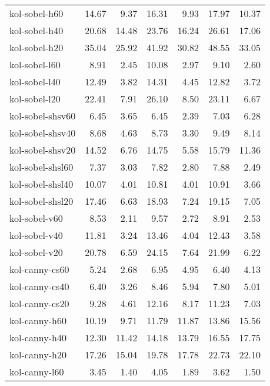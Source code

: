 \begin{tabular}{lrrrrrr}
kol-sobel-h60       &   14.67 &    9.37 &   16.31 &    9.93 &   17.97 &   10.37 \\
kol-sobel-h40       &   20.68 &   14.48 &   23.76 &   16.24 &   26.61 &   17.06 \\
kol-sobel-h20       &   35.04 &   25.92 &   41.92 &   30.82 &   48.55 &   33.05 \\
kol-sobel-l60       &    8.91 &    2.45 &   10.08 &    2.97 &    9.10 &    2.60 \\
kol-sobel-l40       &   12.49 &    3.82 &   14.31 &    4.45 &   12.82 &    3.72 \\
kol-sobel-l20       &   22.41 &    7.91 &   26.10 &    8.50 &   23.11 &    6.67 \\
kol-sobel-shsv60    &    6.45 &    3.65 &    6.45 &    2.39 &    7.03 &    6.28 \\
kol-sobel-shsv40    &    8.68 &    4.63 &    8.73 &    3.30 &    9.49 &    8.14 \\
kol-sobel-shsv20    &   14.52 &    6.76 &   14.75 &    5.58 &   15.79 &   11.36 \\
kol-sobel-shsl60    &    7.37 &    3.03 &    7.82 &    2.80 &    7.88 &    2.49 \\
kol-sobel-shsl40    &   10.07 &    4.01 &   10.81 &    4.01 &   10.91 &    3.66 \\
kol-sobel-shsl20    &   17.46 &    6.63 &   18.93 &    7.24 &   19.15 &    7.05 \\
kol-sobel-v60       &    8.53 &    2.11 &    9.57 &    2.72 &    8.91 &    2.53 \\
kol-sobel-v40       &   11.81 &    3.24 &   13.46 &    4.04 &   12.43 &    3.58 \\
kol-sobel-v20       &   20.78 &    6.59 &   24.15 &    7.64 &   21.99 &    6.22 \\
kol-canny-cs60      &    5.24 &    2.68 &    6.95 &    4.95 &    6.40 &    4.13 \\
kol-canny-cs40      &    6.40 &    3.26 &    8.46 &    5.94 &    7.80 &    5.01 \\
kol-canny-cs20      &    9.28 &    4.61 &   12.16 &    8.17 &   11.23 &    7.03 \\
kol-canny-h60       &   10.19 &    9.71 &   11.79 &   11.87 &   13.86 &   15.56 \\
kol-canny-h40       &   12.30 &   11.42 &   14.18 &   13.79 &   16.55 &   17.75 \\
kol-canny-h20       &   17.26 &   15.04 &   19.78 &   17.78 &   22.73 &   22.10 \\
kol-canny-l60       &    3.45 &    1.40 &    4.05 &    1.89 &    3.62 &    1.50 \\

\end{tabular}
